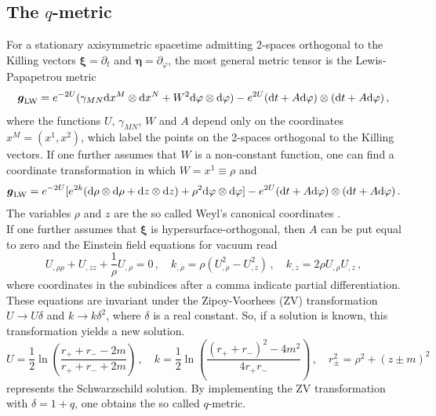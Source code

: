 \documentclass[12pt]{article}
\def\be{\begin{equation}}
\def\ee{\end{equation}}
\newcommand{\rob}[1]{\left(#1\right)}    %
\newcommand{\mbi}[1]{\boldsymbol{#1}}    %
\newcommand{\dd}[1]{{\rm d} #1}
\newcommand{\tprod}[2]{{\rm d}#1 \otimes {\rm d} #2}
\begin{document}
\subsection{The $q$-metric}
For a stationary axisymmetric spacetime admitting 2-spaces orthogonal to the Killing vectors $\mbi{\xi}=\partial_t$ and $\mbi{\eta}=\partial_\varphi$, the most general metric tensor is the Lewis-Papapetrou \cite{lewis1932some,papapetrou1966champs} metric \cite{stephani2003}
\be
 	 \mbi{g}_{\rm LW} = e^{-2U}(\gamma_{MN}\tprod{x^M}{x^N} + W^2\tprod{\varphi}{\varphi})-e^{2U} (\dd{t}+A\dd\varphi)\otimes (\dd{t}+A\dd\varphi)\,,
\ee
where the functions $U$, $\gamma_{MN}$, $W$ and $A$ depend only on the coordinates $x^M=(x^1,x^2)$, which label the points on the 2-spaces orthogonal to the Killing vectors. If one further assumes that $W$ is a non-constant function, one can find a coordinate transformation in which $W=x^1\equiv \rho$ and
\be
	\mbi{g}_{\rm LW} = e^{-2U}[e^{2k}(\tprod{\rho}{\rho} + \tprod{z}{z}) + \rho^2 \tprod{\varphi}{\varphi}] - e^{2U}(\dd{t}+A\dd\varphi)\otimes (\dd{t}+A\dd\varphi)\,.
\ee
The variables $\rho$ and $z$ are the so called Weyl's canonical coordinates \cite{stephani2003}.\\

If one further assumes that $\mbi{\xi}$ is hypersurface-orthogonal, then $A$ can be put equal to zero and the Einstein field equations for vacuum read
\be
	 U\!_{,\rho\rho}+U\!_{,zz}+\frac{1}{\rho}U\!_{,\rho} = 0\,, \quad k_{,\rho}=\rho(U_{,\rho}^2-U_{,z}^2)\,, \quad k_{,z}=2\rho U\!_{,\rho}U\!_{,z}\,,
\ee
where coordinates in the subindices after a comma indicate partial differentiation. These equations are invariant under the Zipoy-Voorhees (ZV) transformation \cite{quevedo2011mass} $U\to U\delta$ and $k\to k\delta^2$, where $\delta$ is a real constant. So, if a solution is known, this transformation yields a new solution.
\be
	U=\frac{1}{2} \ln\rob{\frac{r_{+}+r_{-}-2m}{r_{+}+r_{-}+2m}}\,, \quad k=\frac{1}{2}\ln\rob{\frac{(r_{+}+r_{-})^2-4m^2}{4r_{+}r_{-}}}\,,\quad r_{\pm}^2=\rho^2+(z\pm m)^2
\ee
represents the Schwarzschild solution. By implementing the ZV transformation with $\delta=1+q$, one obtains the so called $q$-metric.\\
\end{document}
